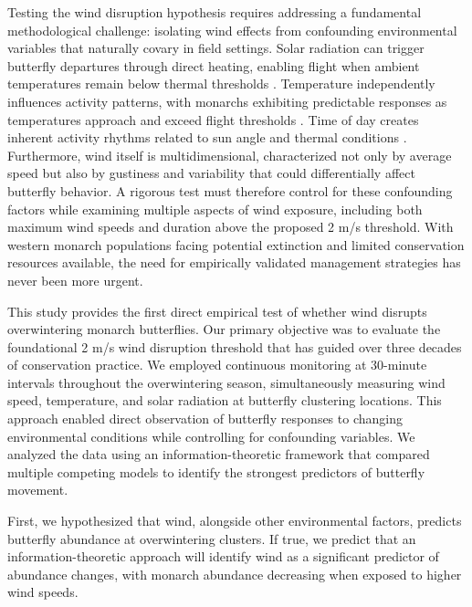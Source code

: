 Testing the wind disruption hypothesis requires addressing a fundamental methodological challenge: isolating wind effects from confounding environmental variables that naturally covary in field settings. Solar radiation can trigger butterfly departures through direct heating, enabling flight when ambient temperatures remain below thermal thresholds \citep{mastersMonarchButterflyDanaus1988,kammerThoracicTemperatureShivering1970}. Temperature independently influences activity patterns, with monarchs exhibiting predictable responses as temperatures approach and exceed flight thresholds \citep{barkerEffectPhotoperiodTemperature1976}. Time of day creates inherent activity rhythms related to sun angle and thermal conditions \citep{mouritsenVirtualMigrationTethered2002}. Furthermore, wind itself is multidimensional, characterized not only by average speed but also by gustiness and variability \citep{nathanLongdistanceBiologicalTransport2005} that could differentially affect butterfly behavior. A rigorous test must therefore control for these confounding factors while examining multiple aspects of wind exposure, including both maximum wind speeds and duration above the proposed 2 m/s threshold. With western monarch populations facing potential extinction and limited conservation resources available, the need for empirically validated management strategies has never been more urgent.

This study provides the first direct empirical test of whether wind disrupts overwintering monarch butterflies. Our primary objective was to evaluate the foundational 2 m/s wind disruption threshold that has guided over three decades of conservation practice. We employed continuous monitoring at 30-minute intervals throughout the overwintering season, simultaneously measuring wind speed, temperature, and solar radiation at butterfly clustering locations. This approach enabled direct observation of butterfly responses to changing environmental conditions while controlling for confounding variables. We analyzed the data using an information-theoretic framework that compared multiple competing models to identify the strongest predictors of butterfly movement.

First, we hypothesized that wind, alongside other environmental factors, predicts butterfly abundance at overwintering clusters. If true, we predict that an information-theoretic approach will identify wind as a significant predictor of abundance changes, with monarch abundance decreasing when exposed to higher wind speeds.

